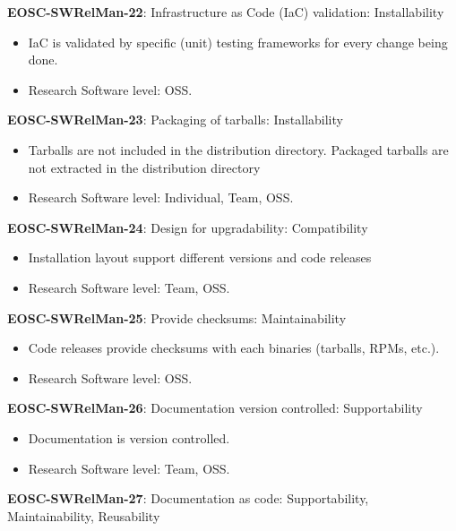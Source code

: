 \textbf{EOSC-SWRelMan-22}: Infrastructure as Code (IaC) validation: Installability

\begin{itemize}
    \item IaC is validated by specific (unit) testing frameworks for every change being done. \cite{orviz_fernandez_eosc-synergy_2020}
    \item Research Software level: OSS.
\end{itemize}

\textbf{EOSC-SWRelMan-23}: Packaging of tarballs: Installability

\begin{itemize}
    \item Tarballs are not included in the distribution directory. Packaged tarballs are not extracted in the distribution directory \cite{raymond_software_2013}
    \item Research Software level: Individual, Team, OSS.
\end{itemize}

\textbf{EOSC-SWRelMan-24}: Design for upgradability: Compatibility

\begin{itemize}
    \item Installation layout support different versions and code releases \cite{raymond_software_2013}
    \item Research Software level: Team, OSS.
\end{itemize}

\textbf{EOSC-SWRelMan-25}: Provide checksums: Maintainability

\begin{itemize}
    \item Code releases provide checksums with each binaries (tarballs, RPMs, etc.). \cite{raymond_software_2013}
    \item Research Software level: OSS.
\end{itemize}

\textbf{EOSC-SWRelMan-26}: Documentation version controlled: Supportability

\begin{itemize}
    \item Documentation is version controlled. \cite{orviz_fernandez_eosc-synergy_2020}
    \item Research Software level: Team, OSS.
\end{itemize}

\textbf{EOSC-SWRelMan-27}: Documentation as code: Supportability, Maintainability, Reusability

